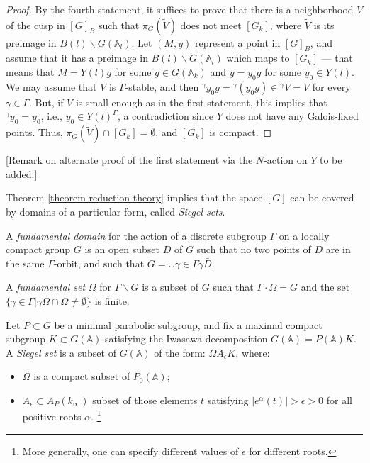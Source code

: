 \begin{proof}
 By the fourth statement, it suffices to prove that there is a neighborhood $V$ of the cusp in $[G]_B$ such that $\pi_G(\tilde V)$ does not meet $[G_k]$, where $\tilde V$ is its preimage in $B(l)\backslash G(\mathbb A_l)$. Let $(M,y)$ represent a point in $[G]_B$, and assume that it has a preimage in $B(l)\backslash G(\mathbb A_l)$ which maps to $[G_k]$ --- that means that $M = Y(l) g$ for some $g\in G(\mathbb A_k)$ and $y = y_0 g$ for some $y_0\in Y(l)$. We may assume that $V$ is $\Gamma$-stable, and then ${^\gamma y_0}g = {^\gamma(y_0g)}\in {^\gamma V} = V$ for every $\gamma\in \Gamma$. But, if $V$ is small enough as in the first statement, this implies that ${^\gamma y_0} = y_0$, i.e., $y_0 \in Y(l)^\Gamma$, a contradiction since $Y$ does not have any Galois-fixed points. Thus, $\pi_G(\tilde V)\cap [G_k] = \emptyset$, and $[G_k]$ is compact. 
 
\end{proof}


\begin{remark}
 \label{remark-reduction-alternate-proof}
[Remark on alternate proof of the first statement via the $N$-action on $Y$ to be added.]
\end{remark}


Theorem \ref{theorem-reduction-theory} implies that the space $[G]$ can be covered by domains of a particular form, called \emph{Siegel sets}.

\begin{definition}
 \label{definition-fundamental-set-domain}
A {\it fundamental domain} for the action of a discrete subgroup $\Gamma$ on a locally compact group $G$ is an open subset $D$ of $G$ such that no two points of $D$ are in the same $\Gamma$-orbit, and such that $G= \cup{\gamma\in \Gamma} \gamma \bar D$. 

A {\it fundamental set} $\Omega$ for $\Gamma\backslash G$ is a subset of $G$ such that $\Gamma\cdot \Omega= G$ and the set $\{\gamma\in \Gamma | \gamma \Omega \cap \Omega \neq \emptyset\}$ is finite. 
\end{definition}


\begin{definition}
 \label{definition-Siegel-set}
Let $P\subset G$ be a minimal parabolic subgroup, and fix a maximal compact subgroup $K\subset G(\mathbb A)$ satisfying the Iwasawa decomposition $G(\mathbb A)= P(\mathbb A) K$. A {\it Siegel set} is a subset of $G(\mathbb A)$ of the form: $\Omega A_\epsilon K$, where: 
\begin{itemize}
 \item $\Omega$ is a compact subset of $P_0(\mathbb A)$;
 \item $A_\epsilon\subset A_P(k_\infty)$ subset of those elements $t$ satisfying $|e^\alpha(t)|>\epsilon>0$ for all positive roots $\alpha$. \footnote{More generally, one can specify different values of $\epsilon$ for different roots.}
\end{itemize} 
\end{definition}

